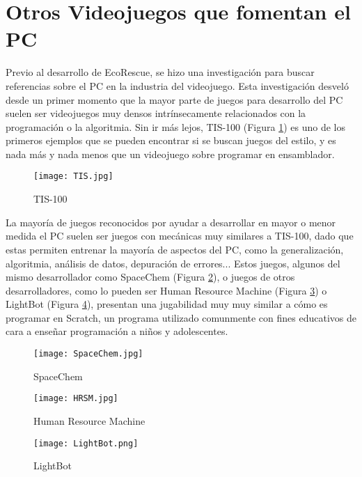 \section{Otros Videojuegos que fomentan el PC}
Previo al desarrollo de EcoRescue, se hizo una investigación para buscar referencias sobre el PC en la industria del videojuego. Esta investigación desveló desde un primer momento que la mayor parte de juegos para desarrollo del PC suelen ser videojuegos muy densos intrínsecamente relacionados con la programación o la algoritmia. Sin ir más lejos, TIS-100\cite{TIS-100} (Figura \ref{fig:tis100}) es uno de los primeros ejemplos que se pueden encontrar si se buscan juegos del estilo, y es nada más y nada menos que un videojuego sobre programar en ensamblador. 

\begin{figure}[H]
    \centering
      \texttt{[image: TIS.jpg]}
    \caption{TIS-100}
    \label{fig:tis100}
\end{figure}

La mayoría de juegos reconocidos por ayudar a desarrollar en mayor o menor medida el PC suelen ser juegos con mecánicas muy similares a TIS-100, dado que estas permiten entrenar la mayoría de aspectos del PC, como la generalización, algoritmia, análisis de datos, depuración de errores... Estos juegos, algunos del mismo desarrollador como SpaceChem\cite{SpaceChem} (Figura \ref{fig:spaceChem}), o juegos de otros desarrolladores, como lo pueden ser Human Resource Machine\cite{hrsm} (Figura \ref{fig:hsrm}) o LightBot\cite{lightbot} (Figura \ref{fig:lightbot}), presentan una jugabilidad muy muy similar a cómo es programar en Scratch\cite{Scratch}, un programa utilizado comunmente con fines educativos de cara a enseñar programación a niños y adolescentes.

\begin{figure}[H]
    \centering
      \texttt{[image: SpaceChem.jpg]}
    \caption{SpaceChem}
    \label{fig:spaceChem}
\end{figure}

\begin{figure}[H]
    \centering
      \texttt{[image: HRSM.jpg]}
    \caption{Human Resource Machine}
    \label{fig:hsrm}
\end{figure}

\begin{figure}[H]
    \centering
      \texttt{[image: LightBot.png]}
    \caption{LightBot}
    \label{fig:lightbot}
\end{figure}

